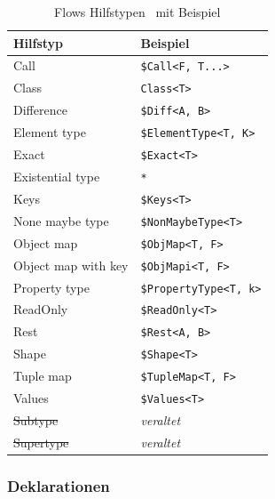 \begin{table}[tbp]
  \footnotesize
  \begin{tabularx}{\textwidth}{@{}ll@{}}
    \midrule
    \textbf{Hilfstyp}   & \textbf{Beispiel}               \\
    \midrule
    Call                & \texttt{\$Call<F, T...>}        \\
    Class               & \texttt{Class<T>}               \\
    Difference          & \texttt{\$Diff<A, B>}           \\
    Element type        & \texttt{\$ElementType<T, K>}    \\
    Exact               & \texttt{\$Exact<T>}             \\
    Existential type    & \texttt{*}                      \\
    Keys                & \texttt{\$Keys<T>}              \\
    None maybe type     & \texttt{\$NonMaybeType<T>}      \\
    Object map          & \texttt{\$ObjMap<T, F>}         \\
    Object map with key & \texttt{\$ObjMapi<T, F>}        \\
    Property type       & \texttt{\$PropertyType<T, k>}   \\
    ReadOnly            & \texttt{\$ReadOnly<T>}          \\
    Rest                & \texttt{\$Rest<A, B>}           \\
    Shape               & \texttt{\$Shape<T>}             \\
    Tuple map           & \texttt{\$TupleMap<T, F>}       \\
    Values              & \texttt{\$Values<T>}            \\
    \sout{Subtype}      & \textit{veraltet}               \\
    \sout{Supertype}    & \textit{veraltet}               \\
    \midrule
  \end{tabularx}
  \caption{Flows Hilfstypen~\autocite{FLOW_UTILITY_TYPES} mit Beispiel}
  \label{tab:flow-utility-types}
\end{table}

\subsubsection{Deklarationen}

